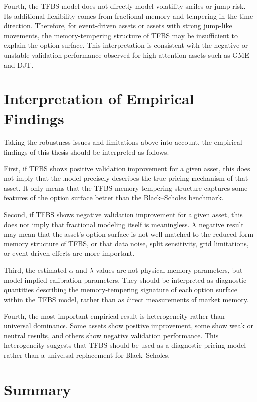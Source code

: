 \documentclass[11pt,a4paper]{report}
\begin{document}
Fourth, the TFBS model does not directly model volatility smiles or jump risk. Its additional flexibility comes from fractional memory and tempering in the time direction. Therefore, for event-driven assets or assets with strong jump-like movements, the memory-tempering structure of TFBS may be insufficient to explain the option surface. This interpretation is consistent with the negative or unstable validation performance observed for high-attention assets such as GME and DJT.

\section{Interpretation of Empirical Findings}

Taking the robustness issues and limitations above into account, the empirical findings of this thesis should be interpreted as follows.

First, if TFBS shows positive validation improvement for a given asset, this does not imply that the model precisely describes the true pricing mechanism of that asset. It only means that the TFBS memory-tempering structure captures some features of the option surface better than the Black--Scholes benchmark.

Second, if TFBS shows negative validation improvement for a given asset, this does not imply that fractional modeling itself is meaningless. A negative result may mean that the asset's option surface is not well matched to the reduced-form memory structure of TFBS, or that data noise, split sensitivity, grid limitations, or event-driven effects are more important.

Third, the estimated $\alpha$ and $\lambda$ values are not physical memory parameters, but model-implied calibration parameters. They should be interpreted as diagnostic quantities describing the memory-tempering signature of each option surface within the TFBS model, rather than as direct measurements of market memory.

Fourth, the most important empirical result is heterogeneity rather than universal dominance. Some assets show positive improvement, some show weak or neutral results, and others show negative validation performance. This heterogeneity suggests that TFBS should be used as a diagnostic pricing model rather than a universal replacement for Black--Scholes.

\section{Summary}
\end{document}
